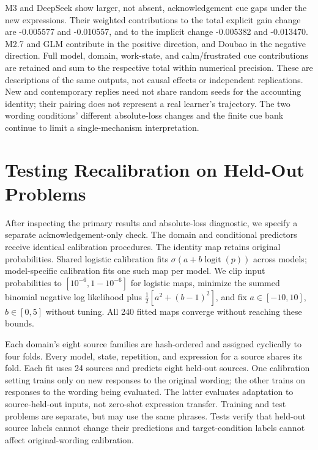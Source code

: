 M3 and DeepSeek show larger, not absent, acknowledgement cue gaps under the new
expressions. Their weighted contributions to the total explicit gain change
are -0.005577 and -0.010557, and to the implicit change -0.005382 and -0.013470.
M2.7 and GLM contribute in the positive direction, and Doubao in the negative
direction. Full model, domain, work-state, and calm/frustrated cue contributions are
retained and sum to the respective total within numerical precision. These
are descriptions of the same outputs, not causal effects or independent
replications. New and contemporary replies need not share random seeds for
the accounting identity; their pairing does not represent a real learner's
trajectory. The two wording conditions' different absolute-loss changes and the
finite cue bank continue to limit a single-mechanism interpretation.


\section{Testing Recalibration on Held-Out Problems}
\label{app:cue-calibration}

After inspecting the primary results and absolute-loss diagnostic, we specify a
separate acknowledgement-only check. The domain and conditional predictors
receive identical calibration procedures. The identity map retains original
probabilities. Shared logistic calibration fits $\sigma(a+b\operatorname{logit}(p))$
across models; model-specific calibration fits one such map per model.
We clip input probabilities to $[10^{-6},1-10^{-6}]$ for logistic maps, minimize
the summed binomial negative log likelihood plus
$\tfrac12[a^2+(b-1)^2]$, and fix $a\in[-10,10]$, $b\in[0,5]$ without tuning.
All 240 fitted maps converge without reaching these bounds.

Each domain's eight source families are hash-ordered and assigned cyclically
to four folds. Every model, state, repetition, and expression for a source
shares its fold. Each fit uses 24 sources and predicts eight held-out sources.
One calibration setting trains only on new responses to the original wording;
the other trains on responses to the wording being evaluated. The
latter evaluates adaptation to source-held-out inputs, not zero-shot expression
transfer. Training and test problems are separate, but may use the same phrases. Tests verify that held-out source labels cannot change their
predictions and target-condition labels cannot affect original-wording calibration.

